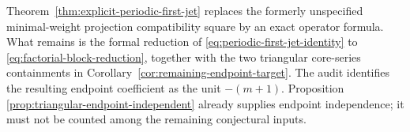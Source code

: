 Theorem~\ref{thm:explicit-periodic-first-jet} replaces the formerly
unspecified minimal-weight projection compatibility square by an exact operator
formula.  What remains is the formal reduction of
\eqref{eq:periodic-first-jet-identity} to
\eqref{eq:factorial-block-reduction}, together with the two triangular
core-series containments in Corollary~\ref{cor:remaining-endpoint-target}.
The audit identifies the resulting endpoint coefficient as the unit
$-(m+1)$.  Proposition
\ref{prop:triangular-endpoint-independent} already supplies endpoint
independence; it must not be counted among the remaining conjectural inputs.
